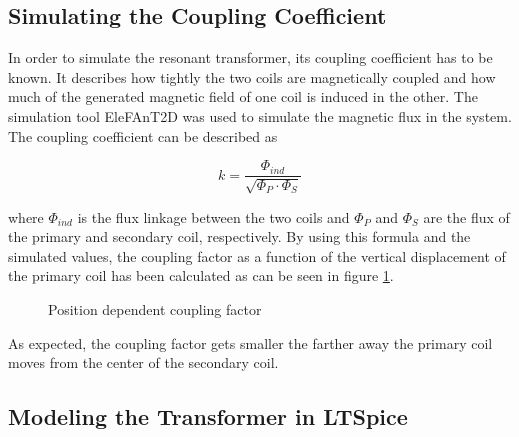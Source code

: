 \subsection{Simulating the Coupling Coefficient}

In order to simulate the resonant transformer, its coupling coefficient has to be known. It describes how tightly the two coils are magnetically coupled and how much of the generated magnetic field of one coil is induced in the other. The simulation tool EleFAnT2D was used to simulate the magnetic flux in the system. The coupling coefficient can be described as

\begin{equation}
    k = \frac{\Phi_{ind}}{\sqrt{\Phi_P \cdot \Phi_S}}
\end{equation}

where \(\Phi_{ind}\) is the flux linkage between the two coils and \(\Phi_P\) and \(\Phi_S\) are the flux of the primary and secondary coil, respectively. By using this formula and the simulated values, the coupling factor as a function of the vertical displacement of the primary coil has been calculated as can be seen in figure \ref{fig:coupling-factor}.

\begin{figure}[h!]
    \centering
    \caption{Position dependent coupling factor}
    \label{fig:coupling-factor}
\end{figure}

As expected, the coupling factor gets smaller the farther away the primary coil moves from the center of the secondary coil.

\subsection{Modeling the Transformer in LTSpice}

